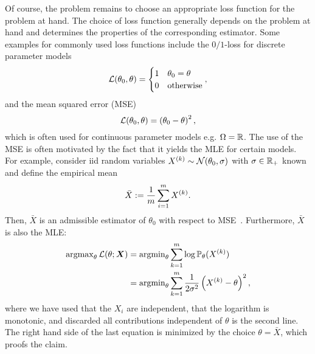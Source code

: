Of course, the problem remains to choose an appropriate loss function for the problem at hand.
The choice of loss function generally depends on the problem at hand and determines the properties of the corresponding estimator.
Some examples for commonly used loss functions include the $0/1$-loss for discrete parameter models
\[
  \mathcal{L}(\theta_0, \theta) =
  \begin{cases}
    1 & \theta_0 = \theta \\
    0 & \mathrm{otherwise}
  \end{cases},
  \label{eq:stat.frequentist.01loss}
\]
and the mean squared error (MSE)
\[
  \mathcal{L}(\theta_0, \theta) = \left( \theta_0 - \theta \right)^2,
  \label{eq:stat.frequentist.l2loss}
\]
which is often used for continuous parameter models e.g. $\Omega = \mathbb{R}$.
The use of the MSE is often motivated by the fact that it yields the MLE for certain models.
For example, consider iid random variables $X^{(k)} \sim \mathcal{N}(\theta_0, \sigma)$ with $\sigma \in \mathbb{R}_+$ known and define the empirical mean
\[
  \label{eq:stat.frequentist.empirical_mean}
  \bar X := \frac{1}{m} \sum_{i = 1}^m X^{(k)}.
\]
Then, $\bar X$ is an admissible estimator of $\theta_0$ with respect to MSE~\cite[Thm.\ 12.20]{Wasserman_2013_All}.
Furthermore, $\bar X$ is also the MLE:
\[
  \label{eq:stat.frequentist.mle_derivation}
  \begin{split}
    \operatorname{argmax}_\theta \mathcal{L}(\theta; {\boldsymbol{X}})
    &= \operatorname{argmin}_\theta \sum_{k=1}^m \log \mathbb{P}_\theta(X^{(k)}) \\
    &= \operatorname{argmin}_\theta \sum_{k=1}^m \frac{1}{2\sigma^2} \left( X^{(k)} - \theta \right)^2,
  \end{split}
\]
where we have used that the $X_i$ are independent, that the logarithm is monotonic, and discarded all contributions independent of $\theta$ is the second line.
The right hand side of the last equation is minimized by the choice $\theta = \bar X$, which proofs the claim.

